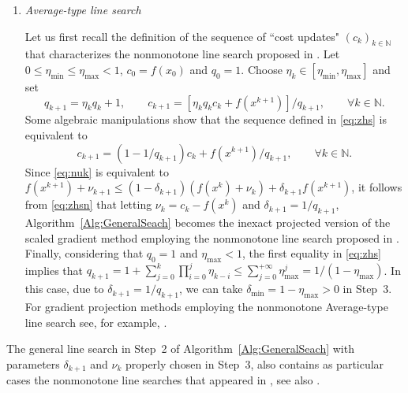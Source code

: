 \begin{enumerate}
	
	\item {\it Average-type line search} 
	
		Let us first recall the definition of the sequence of ``cost updates" $(c_k)_{k\in\mathbb{N}}$  that  characterizes the nonmonotone line search proposed in  \cite{ZhangHager2004}. Let   $0\leq \eta_{\min}\leq \eta_{\max}<1$,   $c_0 = f(x_0)$ and  $q_0 = 1$. Choose $\eta_k\in [\eta_{\min},  \eta_{\max}]$ and set
	\begin{equation} \label{eq:zhs}
		q_{k+1}=\eta_kq_{k}+1, \qquad c_{k+1} = [\eta_kq_kc_k + f(x^{k+1})]/q_{k+1}, \qquad \forall k \in \mathbb{N}.
	\end{equation}
	Some algebraic manipulations show that the sequence defined in   \eqref{eq:zhs} is equivalent to
	\begin{equation} \label{eq:zhsn}
		c_{k+1} = (1-1/q_{k+1})c_{k}+f(x^{k+1})/q_{k+1}, \qquad \forall k \in \mathbb{N}.
	\end{equation}
	Since \eqref{eq:nuk} is equivalent  to  $ f(x^{k+1})+ \nu_{k+1}\leq (1-\delta_{k+1})(f(x^{k})+\nu_{k})+\delta_{k+1}f(x^{k+1})$,  it follows from \eqref{eq:zhsn} that  letting  $\nu_{k}=c_k-f(x^k)$ and $\delta_{k+1}=1/q_{k+1}$, Algorithm~\ref{Alg:GeneralSeach} becomes the  inexact   projected  version of the scaled gradient method employing   the nonmonotone line search proposed in   \cite{ZhangHager2004}.  Finally,  considering that $q_0 = 1$ and  $\eta_{\max}<1$, the  first equality in   \eqref{eq:zhs} implies  that $q_{k+1}=1+\sum_{j=0}^{k}\prod_{i=0}^{j}\eta_{k-i}\leq \sum_{j=0}^{+\infty} \eta_{\max}^{j}=1/(1-\eta_{\max})$. In this case, due to $\delta_{k+1}=1/q_{k+1}$, we can take   $\delta_{\min}=1-\eta_{\max}>0$ in  Step~3.  For gradient projection methods employing   the nonmonotone Average-type line search see, for example, \cite{Paulo2007,Schuverdt2019,  Xihong2018}.
	\end{enumerate}
\begin{remark} \label{rem:outras}
	The general line search in Step~2 of Algorithm~\ref{Alg:GeneralSeach} with  parameters  $\delta_{k+1}$  and  $\nu_{k}$ properly chosen in Step~3, also contains as particular cases the nonmonotone line searches  that appeared in  \cite{Ahookhosh2012,MoLiuYan2007}, see also \cite{GrapigliaSachs2017}.
\end{remark}
